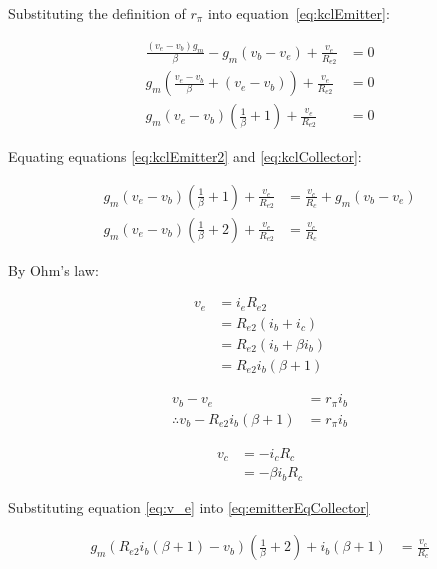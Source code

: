 Substituting the definition of $r_\pi$ into equation~\ref{eq:kclEmitter}:

\begin{subequations}
\begin{align}
\frac{(v_e - v_b)g_m}{\beta} - g_m(v_b - v_e) + \frac{v_e}{R_{e2}} &= 0\\
g_m \left( \frac{v_e - v_b}{\beta} + (v_e - v_b) \right) + \frac{v_e}{R_{e2}} &= 0\\
g_m (v_e - v_b) \left( \frac{1}{\beta} + 1 \right) + \frac{v_e}{R_{e2}} &= 0 \label{eq:kclEmitter2}
\end{align}
\end{subequations}

Equating equations \ref{eq:kclEmitter2} and \ref{eq:kclCollector}:

\begin{subequations}
\begin{align}
g_m (v_e - v_b) \left( \frac{1}{\beta} + 1 \right) + \frac{v_e}{R_{e2}} &= \frac{v_c}{R_c} + g_m(v_b - v_e)\\
g_m (v_e - v_b) \left( \frac{1}{\beta} + 2 \right) + \frac{v_e}{R_{e2}} &= \frac{v_c}{R_c} \label{eq:emitterEqCollector}
\end{align}
\end{subequations}

By Ohm's law:

\begin{subequations}
\begin{align}
v_e &= i_e R_{e2}\\
&= R_{e2} (i_b + i_c)\\
&= R_{e2} (i_b + \beta i_b)\\
&= R_{e2} i_b (\beta + 1) \label{eq:v_e}
\end{align}
\end{subequations}

\begin{subequations}
\begin{align}
v_b - v_e &= r_\pi i_b\\
\therefore v_b - R_{e2} i_b (\beta + 1) &= r_\pi i_b
\end{align}
\end{subequations}

\begin{subequations}
\begin{align}
v_c &= -i_c R_c\\
&= -\beta i_b R_c \label{eq:v_c}
\end{align}
\end{subequations}

Substituting equation \ref{eq:v_e} into \ref{eq:emitterEqCollector}

\begin{subequations}
\begin{align}
g_m \left(R_{e2} i_b (\beta + 1) - v_b\right) \left( \frac{1}{\beta} + 2 \right) + i_b (\beta + 1) &= \frac{v_c}{R_c}
\end{align}
\end{subequations}